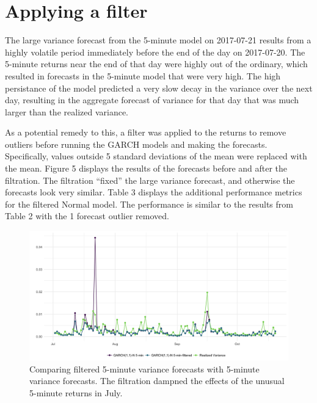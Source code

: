 \documentclass[10pt,twoside,printwatermark=false]{pinp}
\begin{document}
\section{Applying a filter}\label{applying-a-filter}

The large variance forecast from the 5-minute model on 2017-07-21
results from a highly volatile period immediately before the end of the
day on 2017-07-20. The 5-minute returns near the end of that day were
highly out of the ordinary, which resulted in forecasts in the 5-minute
model that were very high. The high persistance of the model predicted a
very slow decay in the variance over the next day, resulting in the
aggregate forecast of variance for that day that was much larger than
the realized variance.

As a potential remedy to this, a filter was applied to the returns to
remove outliers before running the GARCH models and making the
forecasts. Specifically, values outside 5 standard deviations of the
mean were replaced with the mean. Figure 5 displays the results of the
forecasts before and after the filtration. The filtration ``fixed'' the
large variance forecast, and otherwise the forecasts look very similar.
Table 3 displays the additional performance metrics for the filtered
Normal model. The performance is similar to the results from Table 2
with the 1 forecast outlier removed.

\begin{figure}
  \begin{center}
    \includegraphics[width=1.00\textwidth]{../../visualizations/compare_normal_forecasts_filtered} 
  \end{center}
  \caption{Comparing filtered 5-minute variance forecasts with 5-minute variance forecasts. The filtration dampned the effects of the unusual 5-minute returns in July.}\label{fig}
\end{figure}
\end{document}
